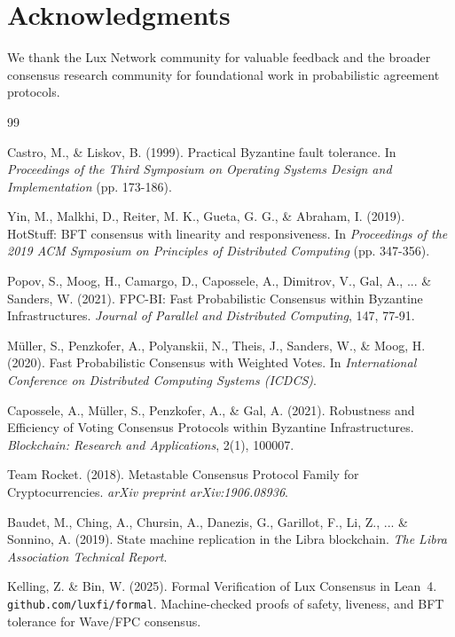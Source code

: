 \section*{Acknowledgments}


We thank the Lux Network community for valuable feedback and the broader consensus research community for foundational work in probabilistic agreement protocols.

\begin{thebibliography}{99}

Castro, M., \& Liskov, B. (1999). Practical Byzantine fault tolerance. In \textit{Proceedings of the Third Symposium on Operating Systems Design and Implementation} (pp. 173-186).

Yin, M., Malkhi, D., Reiter, M. K., Gueta, G. G., \& Abraham, I. (2019). HotStuff: BFT consensus with linearity and responsiveness. In \textit{Proceedings of the 2019 ACM Symposium on Principles of Distributed Computing} (pp. 347-356).

Popov, S., Moog, H., Camargo, D., Capossele, A., Dimitrov, V., Gal, A., ... \& Sanders, W. (2021). FPC-BI: Fast Probabilistic Consensus within Byzantine Infrastructures. \textit{Journal of Parallel and Distributed Computing}, 147, 77-91.

Müller, S., Penzkofer, A., Polyanskii, N., Theis, J., Sanders, W., \& Moog, H. (2020). Fast Probabilistic Consensus with Weighted Votes. In \textit{International Conference on Distributed Computing Systems (ICDCS)}.

Capossele, A., Müller, S., Penzkofer, A., \& Gal, A. (2021). Robustness and Efficiency of Voting Consensus Protocols within Byzantine Infrastructures. \textit{Blockchain: Research and Applications}, 2(1), 100007.

Team Rocket. (2018). Metastable Consensus Protocol Family for Cryptocurrencies. \textit{arXiv preprint arXiv:1906.08936}.

Baudet, M., Ching, A., Chursin, A., Danezis, G., Garillot, F., Li, Z., ... \& Sonnino, A. (2019). State machine replication in the Libra blockchain. \textit{The Libra Association Technical Report}.

Kelling, Z. \& Bin, W. (2025). Formal Verification of Lux Consensus in Lean~4. \texttt{github.com/luxfi/formal}. Machine-checked proofs of safety, liveness, and BFT tolerance for Wave/FPC consensus.

\end{thebibliography}

